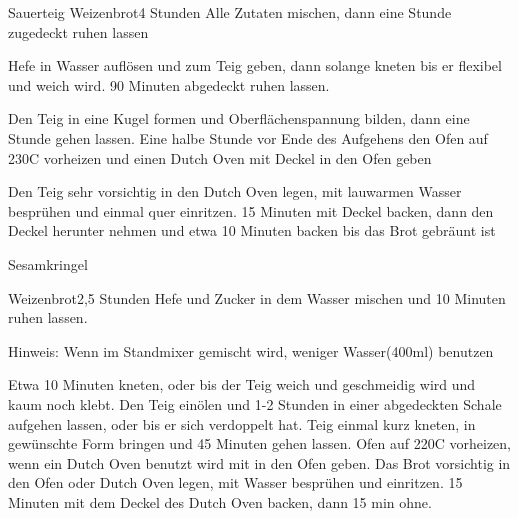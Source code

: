 \begin{recipe}{Sauerteig Weizenbrot}{}{4 Stunden}
Alle Zutaten mischen, dann eine Stunde zugedeckt ruhen lassen

Hefe in Wasser auflösen und zum Teig geben, dann solange kneten bis er flexibel und weich wird.
90 Minuten abgedeckt ruhen lassen.

\ing[]{}{}
Den Teig in eine Kugel formen und Oberflächenspannung bilden, dann eine Stunde gehen lassen.
Eine halbe Stunde vor Ende des Aufgehens den Ofen auf 230\0C vorheizen und einen Dutch Oven mit Deckel in den Ofen geben

\ing[]{}{}
Den Teig sehr vorsichtig in den Dutch Oven legen, mit lauwarmen Wasser besprühen und einmal quer einritzen. 15 Minuten mit Deckel backen, dann den Deckel herunter nehmen und etwa 10 Minuten backen bis das Brot gebräunt ist
\end{recipe}



\begin{recipe}{Sesamkringel}{}{}

\end{recipe}



\begin{recipe}{Weizenbrot}{}{2,5 Stunden}
Hefe und Zucker in dem Wasser mischen und 10 Minuten ruhen lassen.

Hinweis: Wenn im Standmixer gemischt wird, weniger Wasser(400ml) benutzen

Etwa 10 Minuten kneten, oder bis der Teig weich und geschmeidig wird und kaum noch klebt.
Den Teig einölen und 1-2 Stunden in einer abgedeckten Schale aufgehen lassen, oder bis er sich verdoppelt hat.
Teig einmal kurz kneten, in gewünschte Form bringen und 45 Minuten gehen lassen.
Ofen auf 220\0C vorheizen, wenn ein Dutch Oven benutzt wird mit in den Ofen geben.
Das Brot vorsichtig in den Ofen oder Dutch Oven legen, mit Wasser besprühen und einritzen.
15 Minuten mit dem Deckel des Dutch Oven backen, dann 15 min ohne.
\end{recipe}

